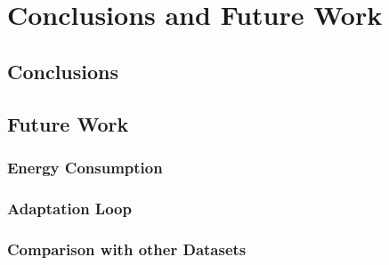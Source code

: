 

\chapter{Conclusions and Future Work}
\label{ch:conclusions-and-future-work}

    \section{Conclusions}
    \label{sec:conclusions}



    \section{Future Work}
    \label{sec:future-work}


        \subsection{Energy Consumption}
        \label{sec:energy-consumption-future-work}


        \subsection{Adaptation Loop}
        \label{sec:adaptation-loop-future-work}


        \subsection{Comparison with other Datasets}
        \label{sec:comparison-with-other-datasets-future-work}

